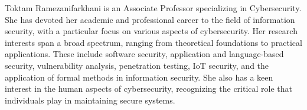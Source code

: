 \documentclass{ieeeaccess}
\begin{document}
\begin{IEEEbiography}{Toktam Ramezanifarkhani}  is an Associate Professor specializing in Cybersecurity. She has devoted her academic and professional career to the field of information security, with a particular focus on various aspects of cybersecurity. Her research interests span a broad spectrum, ranging from theoretical foundations to practical applications. These include software security, application and language-based security, vulnerability analysis, penetration testing, IoT security, and the application of formal methods in information security. She also has a keen interest in the human aspects of cybersecurity, recognizing the critical role that individuals play in maintaining secure systems.
\end{IEEEbiography}
\balance

\EOD
\end{document}
